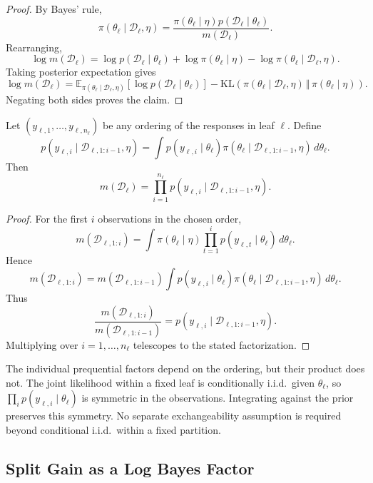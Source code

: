 \begin{proof}
By Bayes' rule,
\[
\pi(\theta_\ell\mid\mathcal{D}_\ell,\eta)
=
\frac{
\pi(\theta_\ell\mid\eta)
p(\mathcal{D}_\ell\mid\theta_\ell)
}{
m(\mathcal{D}_\ell)
}.
\]
Rearranging,
\[
\log m(\mathcal{D}_\ell)
=
\log p(\mathcal{D}_\ell\mid\theta_\ell)
+
\log\pi(\theta_\ell\mid\eta)
-
\log\pi(\theta_\ell\mid\mathcal{D}_\ell,\eta).
\]
Taking posterior expectation gives
\[
\log m(\mathcal{D}_\ell)
=
\mathbb{E}_{\pi(\theta_\ell\mid\mathcal{D}_\ell,\eta)}
[\log p(\mathcal{D}_\ell\mid\theta_\ell)]
-
\mathrm{KL}\!\left(
\pi(\theta_\ell\mid\mathcal{D}_\ell,\eta)
\,\Vert\,
\pi(\theta_\ell\mid\eta)
\right).
\]
Negating both sides proves the claim.
\end{proof}

\begin{lemma}
Let $(y_{\ell,1},\dots,y_{\ell,n_\ell})$ be any ordering of the responses in leaf $\ell$.
Define
\[
p(y_{\ell,i}\mid\mathcal{D}_{\ell,1:i-1},\eta)
=
\int p(y_{\ell,i}\mid\theta_\ell)
\pi(\theta_\ell\mid\mathcal{D}_{\ell,1:i-1},\eta)\,d\theta_\ell .
\]
Then
\[
m(\mathcal{D}_\ell)
=
\prod_{i=1}^{n_\ell}
p(y_{\ell,i}\mid\mathcal{D}_{\ell,1:i-1},\eta).
\]
\end{lemma}

\begin{proof}
For the first $i$ observations in the chosen order,
\[
m(\mathcal{D}_{\ell,1:i})
=
\int
\pi(\theta_\ell\mid\eta)
\prod_{t=1}^{i}p(y_{\ell,t}\mid\theta_\ell)
\,d\theta_\ell .
\]
Hence
\[
m(\mathcal{D}_{\ell,1:i})
=
m(\mathcal{D}_{\ell,1:i-1})
\int
p(y_{\ell,i}\mid\theta_\ell)
\pi(\theta_\ell\mid\mathcal{D}_{\ell,1:i-1},\eta)
\,d\theta_\ell .
\]
Thus
\[
\frac{
m(\mathcal{D}_{\ell,1:i})
}{
m(\mathcal{D}_{\ell,1:i-1})
}
=
p(y_{\ell,i}\mid\mathcal{D}_{\ell,1:i-1},\eta).
\]
Multiplying over $i=1,\dots,n_\ell$ telescopes to the stated factorization.
\end{proof}

\begin{remark}
The individual prequential factors depend on the ordering, but their product does not. The joint likelihood within a fixed leaf is conditionally i.i.d.\ given $\theta_\ell$, so
$\prod_i p(y_{\ell,i}\mid\theta_\ell)$ is symmetric in the observations. Integrating against the prior preserves this symmetry. No separate exchangeability assumption is required beyond conditional i.i.d.\ within a fixed partition.
\end{remark}


\subsection{Split Gain as a Log Bayes Factor}
\label{app:split_bayes_factor}


